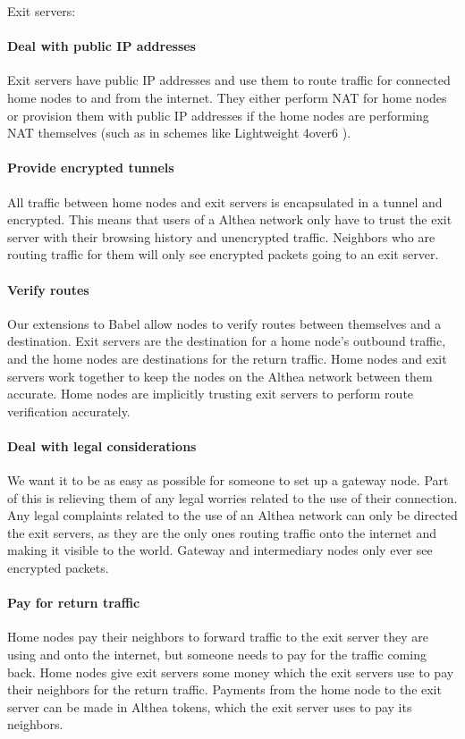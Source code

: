 \documentclass[11pt]{article}
\begin{document}
Exit servers:

\paragraph{Deal with public IP addresses}
Exit servers have public IP addresses and use them to route traffic for connected home nodes to and from the internet. They either perform NAT for home nodes or provision them with public IP addresses if the home nodes are performing NAT themselves (such as in schemes like Lightweight 4over6 \cite{4over6}). 

\paragraph{Provide encrypted tunnels}
All traffic between home nodes and exit servers is encapsulated in a tunnel and encrypted. This means that users of a Althea network only have to trust the exit server with their browsing history and unencrypted traffic. Neighbors who are routing traffic for them will only see encrypted packets going to an exit server.

\paragraph{Verify routes}
Our extensions to Babel allow nodes to verify routes between themselves and a destination. Exit servers are the destination for a home node’s outbound traffic, and the home nodes are destinations for the return traffic. Home nodes and exit servers work together to keep the nodes on the Althea network between them accurate. Home nodes are implicitly trusting exit servers to perform route verification accurately.

\paragraph{Deal with legal considerations}
We want it to be as easy as possible for someone to set up a gateway node. Part of this is relieving them of any legal worries related to the use of their connection. Any legal complaints related to the use of an Althea network can only be directed the exit servers, as they are the only ones routing traffic onto the internet and making it visible to the world. Gateway and intermediary nodes only ever see encrypted packets.

\paragraph{Pay for return traffic}
Home nodes pay their neighbors to forward traffic to the exit server they are using and onto the internet, but someone needs to pay for the traffic coming back. Home nodes give exit servers some money which the exit servers use to pay their neighbors for the return traffic. Payments from the home node to the exit server can be made in Althea tokens, which the exit server uses to pay its neighbors.
\end{document}
